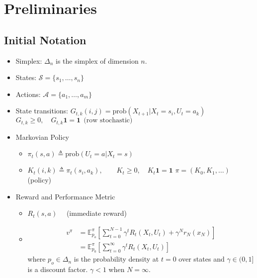 \documentclass[]{article}
\newcommand{\mc}{\mathcal}
\newcommand{\mbf}{\mathbf}
\newcommand{\mb}{\mathbb}
\begin{document}
\section*{Preliminaries}
\subsection*{Initial Notation}
\begin{itemize}
\item Simplex: $\Delta_n$ is the simplex of dimension $n$.  
\item States: $\mc{S} = \{s_1,\dots,s_n\}$
\item Actions: $\mc{A} = \{a_1,\dots,a_m\}$
\item State transitions:
\subitem $G_{t,k}(i,j) = \text{prob}(X_{t+1}| X_t = s_i, U_t = a_k)$
\subitem $G_{t,k} \geq 0, \quad G_{t,k}\mbf{1} = \mbf{1} \ \ \text{(row stochastic)}$
\item Markovian Policy
\begin{itemize}
\item $\pi_t(s,a) \triangleq \text{prob}(U_t = a | X_t = s)$
\item $K_t(i,k) \triangleq \pi_t(s_i,a_k), \qquad K_t \geq 0, \quad K_t \mbf{1} = \mathbf{1}$
\newline $\pi  = (K_0,K_1,\dots) \quad$ (policy)
\end{itemize}
\item Reward and Performance Metric
\begin{itemize}
\item $R_t(s,a) \quad$ (immediate reward)
\item 
\begin{align}
v^\pi & = \mb{E}_{p_o}^\pi
\left[\sum_{t=0}^{N-1} \gamma^t R_t(X_t,U_t) + \gamma^Nr_N(x_N) \right] \\
& = \mb{E}_{p_0}^\pi \left[ \sum_{t=0}^\infty \gamma^t R_t(X_t,U_t) \right]
\end{align}
where $p_o \in \Delta_n$ is the probability density at $t=0$ over states and $\gamma \in (0,1]$ is a discount factor.
$\gamma < 1$ when $N= \infty$.
\end{itemize}
\end{itemize}
\end{document}
